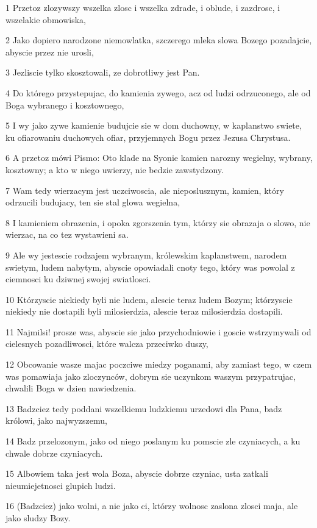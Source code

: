 \par 1 Przetoz zlozywszy wszelka zlosc i wszelka zdrade, i oblude, i zazdrosc, i wszelakie obmowiska,
\par 2 Jako dopiero narodzone niemowlatka, szczerego mleka slowa Bozego pozadajcie, abyscie przez nie urosli,
\par 3 Jezliscie tylko skosztowali, ze dobrotliwy jest Pan.
\par 4 Do którego przystepujac, do kamienia zywego, acz od ludzi odrzuconego, ale od Boga wybranego i kosztownego,
\par 5 I wy jako zywe kamienie budujcie sie w dom duchowny, w kaplanstwo swiete, ku ofiarowaniu duchowych ofiar, przyjemnych Bogu przez Jezusa Chrystusa.
\par 6 A przetoz mówi Pismo: Oto klade na Syonie kamien narozny wegielny, wybrany, kosztowny; a kto w niego uwierzy, nie bedzie zawstydzony.
\par 7 Wam tedy wierzacym jest uczciwoscia, ale nieposlusznym, kamien, który odrzucili budujacy, ten sie stal glowa wegielna,
\par 8 I kamieniem obrazenia, i opoka zgorszenia tym, którzy sie obrazaja o slowo, nie wierzac, na co tez wystawieni sa.
\par 9 Ale wy jestescie rodzajem wybranym, królewskim kaplanstwem, narodem swietym, ludem nabytym, abyscie opowiadali cnoty tego, który was powolal z ciemnosci ku dziwnej swojej swiatlosci.
\par 10 Którzyscie niekiedy byli nie ludem, alescie teraz ludem Bozym; którzyscie niekiedy nie dostapili byli milosierdzia, alescie teraz milosierdzia dostapili.
\par 11 Najmilsi! prosze was, abyscie sie jako przychodniowie i goscie wstrzymywali od cielesnych pozadliwosci, które walcza przeciwko duszy,
\par 12 Obcowanie wasze majac poczciwe miedzy poganami, aby zamiast tego, w czem was pomawiaja jako zloczynców, dobrym sie uczynkom waszym przypatrujac, chwalili Boga w dzien nawiedzenia.
\par 13 Badzciez tedy poddani wszelkiemu ludzkiemu urzedowi dla Pana, badz królowi, jako najwyzszemu,
\par 14 Badz przelozonym, jako od niego poslanym ku pomscie zle czyniacych, a ku chwale dobrze czyniacych.
\par 15 Albowiem taka jest wola Boza, abyscie dobrze czyniac, usta zatkali nieumiejetnosci glupich ludzi.
\par 16 (Badzciez) jako wolni, a nie jako ci, którzy wolnosc zaslona zlosci maja, ale jako sludzy Bozy.

